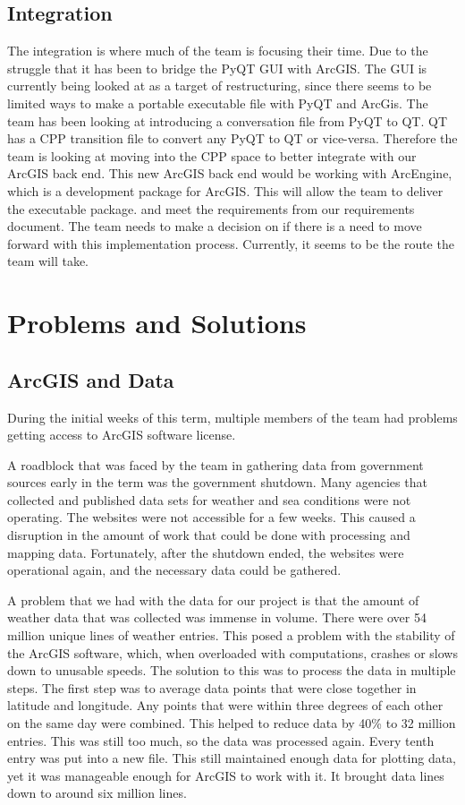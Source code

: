 \documentclass[onecolumn, draftclsnofoot,10pt, compsoc]{IEEEtran}
\begin{document}
\subsection{Integration}
The integration is where much of the team is focusing their time. Due to the struggle that it has been to bridge the PyQT GUI with ArcGIS. The GUI is currently being looked at as a target of restructuring, since there seems to be limited ways to make a portable executable file with PyQT and ArcGis. The team has been looking at introducing a conversation file from PyQT to QT. QT has a CPP transition file to convert any PyQT to QT or vice-versa. Therefore the team is looking at moving into the CPP space to better integrate with our ArcGIS back end. This new ArcGIS back end would be working with ArcEngine, which is a development package for ArcGIS. This will allow the team to deliver the executable package. and meet the requirements from our requirements document. The team needs to make a decision on if there is a need to move forward with this implementation process. Currently, it seems to be the route the team will take.


\section{Problems and Solutions}
\subsection{ArcGIS and Data}
During the initial weeks of this term, multiple members of the team had problems getting access to ArcGIS software license. 

\par A roadblock that was faced by the team in gathering data from government sources early in the term was the government shutdown.  Many agencies that collected and published data sets for weather and sea conditions were not operating. The websites were not accessible for a few weeks.  This caused a disruption in the amount of work that could be done with processing and mapping data.  Fortunately, after the shutdown ended, the websites were operational again, and the necessary data could be gathered.

A problem that we had with the data for our project is that the amount of weather data that was collected was immense in volume.  There were over 54 million unique lines of weather entries.  This posed a problem with the stability of the ArcGIS software, which, when overloaded with computations, crashes or slows down to unusable speeds.  The solution to this was to process the data in multiple steps.  The first step was to average data points that were close together in latitude and longitude.  Any points that were within three degrees of each other on the same day were combined.  This helped to reduce data by 40\% to 32 million entries.  This was still too much, so the data was processed again.  Every tenth entry was put into a new file.  This still maintained enough data for plotting data, yet it was manageable enough for ArcGIS to work with it.  It brought data lines down to around six million lines.
\end{document}
